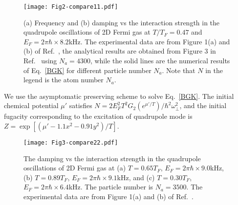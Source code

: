 \begin{figure}[t]
\centering
\texttt{[image: Fig2-compare11.pdf]}
\caption[(a) Frequency and (b) damping vs the interaction strength in the quadrupole oscillations of 2D Fermi gas at $T/T_F=0.47$ and $E_F=2\pi\hbar\times8.2$kHz.]{  (a) Frequency and (b) damping vs the interaction strength in the quadrupole oscillations of 2D Fermi gas at $T/T_F=0.47$ and $E_F=2\pi\hbar\times8.2$kHz. The experimental data are from Figure 1(a) and (b) of Ref.~\cite{Vogt2012}, the analytical results are obtained from Figure 3 in Ref.~\cite{bruun_2012} using $N_a=4300$, while the solid lines are the numerical results of Eq.~\eqref{BGK} for different particle number $N_a$. Note that $N$ in the legend is the atom number $N_a$.}
\label{fig2}
\end{figure}


We use the asymptomatic preserving scheme to solve Eq.~\eqref{BGK}. The initial chemical potential $\mu'$ satisfies $N={2E_F^2}T^2G_2(e^{\mu'/T})/{\hbar^2\omega_\bot^2}$, and the initial fugacity corresponding to the excitation of quadrupole mode is $Z=\exp[(\mu'-1.1x^2-0.91y^2)/T]$.

\begin{figure}[tb]
\centering
\texttt{[image: Fig3-compare22.pdf]}
\caption[The damping vs the interaction strength in the quadrupole oscillations of 2D Fermi gas at (a) $T=0.65T_F$, $E_F=2\pi\hbar\times9.0$kHz, (b) $T=0.89T_F$, $E_F=2\pi\hbar\times9.1$kHz, and (c) $T=0.30T_F$, $E_F=2\pi\hbar\times6.4$kHz.]
{The damping vs the interaction strength in the quadrupole oscillations of 2D Fermi gas at (a) $T=0.65T_F$, $E_F=2\pi\hbar\times9.0$kHz, (b) $T=0.89T_F$, $E_F=2\pi\hbar\times9.1$kHz, and (c) $T=0.30T_F$, $E_F=2\pi\hbar\times6.4$kHz. The particle number is $N_a=3500$. The experimental data are from Figure 1(a) and (b) of Ref.~\cite{Vogt2012}.}
\label{fig3}
\end{figure}


